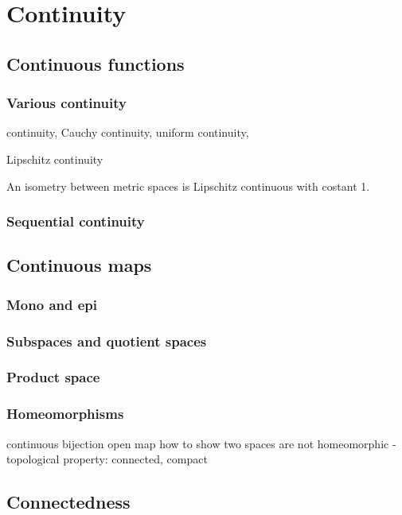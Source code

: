 \documentclass{../crs}
\begin{document}
\chapter{Continuity}


\section{Continuous functions}

\subsection{Various continuity}
continuity, Cauchy continuity, uniform continuity, 

Lipschitz continuity
\begin{ex}
An isometry between metric spaces is Lipschitz continuous with costant 1.
\end{ex}

\subsection{Sequential continuity}




\section{Continuous maps}

\subsection{Mono and epi}

\subsection{Subspaces and quotient spaces}

\subsection{Product space}

\subsection{Homeomorphisms}
continuous bijection
open map
how to show two spaces are not homeomorphic
- topological property: connected, compact


\section{Connectedness}
\end{document}
